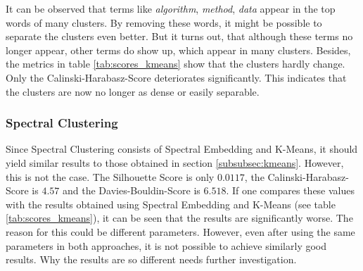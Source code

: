 It can be observed that terms like \textit{algorithm}, \textit{method}, \textit{data} appear in the top words of many clusters.
By removing these words, it might be possible to separate the clusters even better. 
But it turns out, that although these terms no longer appear, other terms do show up, which appear in many clusters.
Besides, the metrics in table \ref{tab:scores_kmeans} show that the clusters hardly change.
Only the Calinski-Harabasz-Score deteriorates significantly. This indicates that the clusters are now no longer as dense or easily separable.


\subsubsection{Spectral Clustering}
Since Spectral Clustering consists of Spectral Embedding and K-Means, it should yield similar results to those obtained in section \ref{subsubsec:kmeans}.
However, this is not the case.
The Silhouette Score is only $0.0117$, the Calinski-Harabasz-Score is $4.57$ and the Davies-Bouldin-Score is $6.518$.
If one compares these values with the results obtained using Spectral Embedding and K-Means (see table \ref{tab:scores_kmeans}), it can be seen that the results are significantly worse.
The reason for this could be different parameters.
However, even after using the same parameters in both approaches, it is not possible to achieve similarly good results. 
Why the results are so different needs further investigation.



